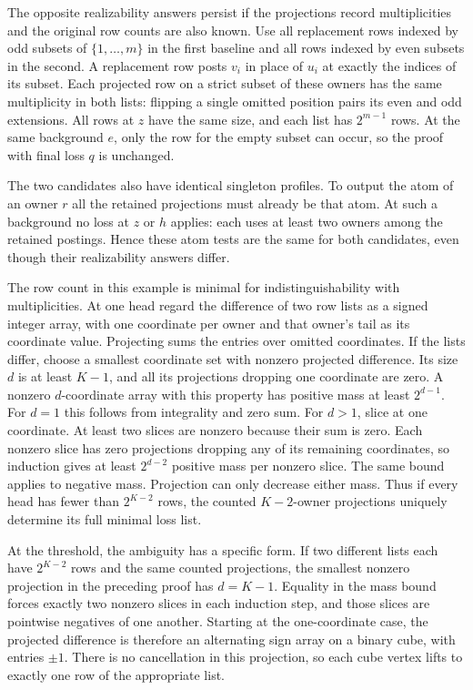 The opposite realizability answers persist if the
projections record multiplicities and the original row
counts are also known. Use all replacement rows indexed
by odd subsets of $\{1,\ldots,m\}$ in the first
baseline and all rows indexed by even subsets in the
second. A replacement row posts $v_i$ in place of
$u_i$ at exactly the indices of its subset. Each
projected row on a strict subset of these owners has
the same multiplicity in both lists: flipping a
single omitted position pairs its even and odd
extensions. All rows at $z$ have the same size,
and each list has $2^{m-1}$ rows. At the same
background $e$, only the row for the empty subset
can occur, so the proof with final loss $q$ is
unchanged.

The two candidates also have identical singleton
profiles. To output the atom of an owner $r$ all the
retained projections must already be that atom.
At such a background no loss at $z$ or $h$ applies:
each uses at least two owners among the retained
postings. Hence these atom tests are the same for
both candidates, even though their realizability
answers differ.

The row count in this example is minimal for
indistinguishability with multiplicities. At one
head regard the difference of two row lists as a
signed integer array, with one coordinate per
owner and that owner's tail as its coordinate
value. Projecting sums the entries over omitted
coordinates. If the lists differ, choose a smallest
coordinate set with nonzero projected difference.
Its size $d$ is at least $K-1$, and all its
projections dropping one coordinate are zero.
A nonzero $d$-coordinate array with this property
has positive mass at least $2^{d-1}$. For $d=1$ this
follows from integrality and zero sum. For $d>1$,
slice at one coordinate. At least two slices are
nonzero because their sum is zero. Each nonzero
slice has zero projections dropping any of its
remaining coordinates, so induction gives at least
$2^{d-2}$ positive mass per nonzero slice. The same
bound applies to negative mass. Projection can only
decrease either mass. Thus if every head has fewer
than $2^{K-2}$ rows, the counted $K-2$-owner projections
uniquely determine its full minimal loss list.

At the threshold, the ambiguity has a specific form.
If two different lists each have $2^{K-2}$ rows
and the same counted projections, the smallest
nonzero projection in the preceding proof has
$d=K-1$. Equality in the mass bound forces
exactly two nonzero slices in each induction step,
and those slices are pointwise negatives of one
another. Starting at the one-coordinate case,
the projected difference is therefore an alternating
sign array on a binary cube, with entries $\pm1$.
There is no cancellation in this projection, so
each cube vertex lifts to exactly one row of the
appropriate list.

